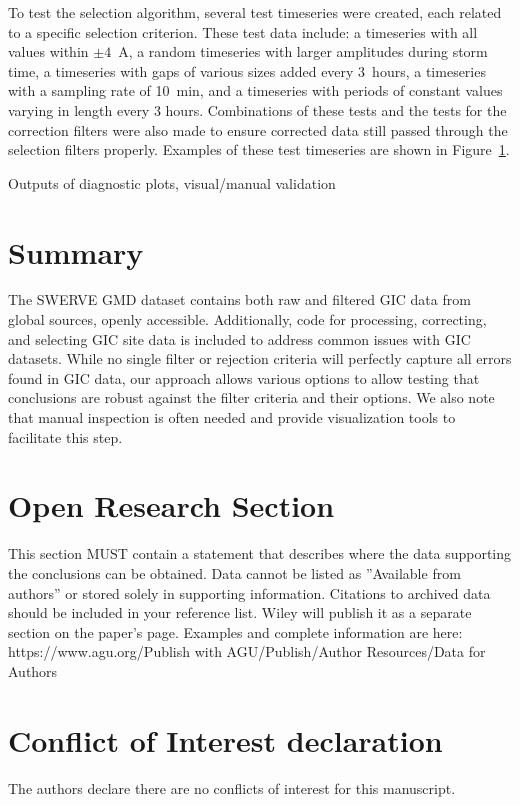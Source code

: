 \documentclass[draft]{agujournal2019}
\begin{document}
To test the selection algorithm, several test timeseries were created, each related to a specific selection criterion. These test data include: a timeseries with all values within $\pm4$~A, a random timeseries with larger amplitudes during storm time, a timeseries with gaps of various sizes added every 3~hours, a timeseries with a sampling rate of 10~min, and a timeseries with periods of constant values varying in length every 3 hours. Combinations of these tests and the tests for the correction filters were also made to ensure corrected data still passed through the selection filters properly. Examples of these test timeseries are shown in Figure~\ref{}.

Outputs of diagnostic plots, visual/manual validation

\section{Summary}
The SWERVE GMD dataset contains both raw and filtered GIC data from global sources, openly accessible. 
Additionally, code for processing, correcting, and selecting GIC site data is included to address common issues with GIC datasets. While no single filter or rejection criteria will perfectly capture all errors found in GIC data, our approach allows various options to allow testing that conclusions are robust against the filter criteria and their options. We also note that manual inspection is often needed and provide visualization tools to facilitate this step.

%
%

\section*{Open Research Section}
This section MUST contain a statement that describes where the data supporting the conclusions can be obtained. Data cannot be listed as ''Available from authors'' or stored solely in supporting information. Citations to archived data should be included in your reference list. Wiley will publish it as a separate section on the paper’s page. Examples and complete information are here:
https://www.agu.org/Publish with AGU/Publish/Author Resources/Data for Authors


\section*{Conflict of Interest declaration}
The authors declare there are no conflicts of interest for this manuscript.
\end{document}
